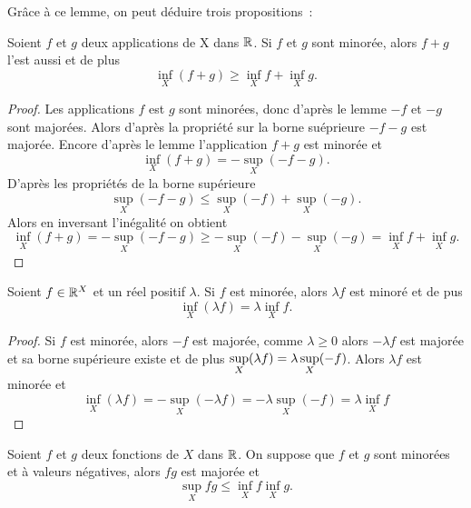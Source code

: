Grâce à ce lemme, on peut déduire trois propositions~:
\begin{prop}
  Soient $f$ et $g$ deux applications de X dans $\mathbb{R}$. Si $f$ et $g$ sont minorée, alors $f+g$ l'est aussi et de plus
  \begin{equation}
    \inf\limits_{X}(f+g) \geq \inf\limits_{X} f + \inf\limits_{X} g.
  \end{equation}
\end{prop}
\begin{proof}
  Les applications $f$ est $g$ sont minorées, donc d'après le lemme $-f$ et $-g$ sont majorées. Alors d'après la propriété sur la borne suéprieure $-f-g$ est majorée. Encore d'après le lemme l'application $f+g$ est minorée et
  \begin{equation}
    \inf\limits_{X}(f+g)=-\sup\limits_{X}(-f-g).
  \end{equation}
  D'après les propriétés de la borne supérieure
  \begin{equation}
    \sup\limits_{X}(-f-g) \leq \sup\limits_{X}(-f) + \sup\limits_{X}(-g).
  \end{equation}
  Alors en inversant l'inégalité on obtient
  \begin{equation}
    \inf\limits_{X}(f+g) = - \sup\limits_{X}(-f-g) \geq -\sup\limits_{X}(-f) - \sup\limits_{X}(-g) = \inf\limits_{X} f + \inf\limits_{X} g.
  \end{equation}
\end{proof}
\begin{prop}
  Soient $f \in \mathbb{R}^X$ et un réel positif $\lambda$. Si $f$ est minorée, alors $\lambda f$ est minoré et de pus
  \begin{equation}
    \inf\limits_{X} (\lambda f) = \lambda \inf\limits_{X} f.
  \end{equation}
\end{prop}
\begin{proof}
  Si $f$ est minorée, alors $-f$ est majorée, comme $\lambda \geq 0$ alors $-\lambda f$ est majorée et sa borne supérieure existe et de plus $\sup\limits_{X}(\-\lambda f)=\lambda \sup\limits_{X}(-f)$. Alors $\lambda f$ est minorée et 
  \begin{equation}
    \inf\limits_{X}(\lambda f) = -\sup\limits_{X}(-\lambda f)=-\lambda\sup\limits_{X}(-f)= \lambda\inf\limits_{X} f
  \end{equation}
\end{proof}
\begin{prop}
  Soient $f$ et $g$ deux fonctions de $X$ dans $\mathbb{R}$. On suppose que $f$ et $g$ sont minorées et à valeurs négatives, alors $fg$ est majorée et
  \begin{equation}
    \sup\limits_{X} fg \leq \inf\limits_{X} f \inf\limits_{X} g.
  \end{equation}
\end{prop}

